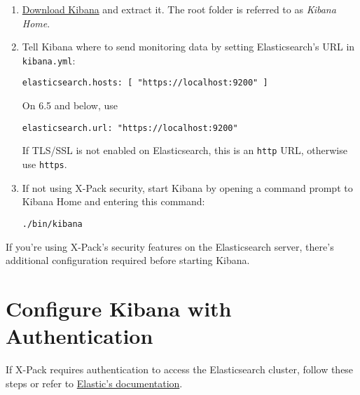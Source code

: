\begin{enumerate}
\def\labelenumi{\arabic{enumi}.}
\item
  \href{https://www.elastic.co/downloads/kibana}{Download Kibana} and
  extract it. The root folder is referred to as \emph{Kibana Home}.
\item
  Tell Kibana where to send monitoring data by setting Elasticsearch's
  URL in \texttt{kibana.yml}:

\begin{verbatim}
elasticsearch.hosts: [ "https://localhost:9200" ]
\end{verbatim}

  On 6.5 and below, use

\begin{verbatim}
elasticsearch.url: "https://localhost:9200"
\end{verbatim}

  If TLS/SSL is not enabled on Elasticsearch, this is an \texttt{http}
  URL, otherwise use \texttt{https}.
\item
  If not using X-Pack security, start Kibana by opening a command prompt
  to Kibana Home and entering this command:

\begin{verbatim}
./bin/kibana
\end{verbatim}
\end{enumerate}

If you're using X-Pack's security features on the Elasticsearch server,
there's additional configuration required before starting Kibana.

\section{Configure Kibana with
Authentication}\label{configure-kibana-with-authentication}

If X-Pack requires authentication to access the Elasticsearch cluster,
follow these steps or refer to
\href{https://www.elastic.co/guide/en/kibana/7.x/monitoring-xpack-kibana.html}{Elastic's
documentation}.

